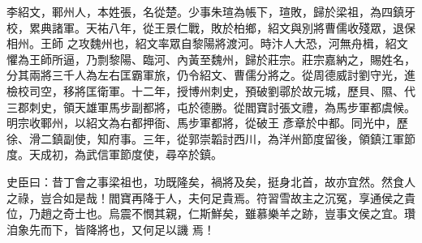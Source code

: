 \begin{pinyinscope}
 李紹文，鄆州人，本姓張，名從楚。少事朱瑄為帳下，瑄敗，歸於梁祖，為四鎮牙校，累典諸軍。天祐八年，從王景仁戰，敗於柏鄉，紹文與別將曹儒收殘眾，退保相州。王師
 之攻魏州也，紹文率眾自黎陽將渡河。時汴人大恐，河無舟楫，紹文懼為王師所逼，乃剽黎陽、臨河、內黃至魏州，歸於莊宗。莊宗嘉納之，賜姓名，分其兩將三千人為左右匡霸軍旅，仍令紹文、曹儒分將之。從周德威討劉守光，進檢校司空，移將匡衛軍。十二年，授博州刺史，預破劉鄩於故元城，歷貝、隰、代三郡刺史，領天雄軍馬步副都將，屯於德勝。從閻寶討張文禮，為馬步軍都虞候。明宗收鄆州，以紹文為右都押衙、馬步軍都將，從破王
 彥章於中都。同光中，歷徐、滑二鎮副使，知府事。三年，從郭崇韜討西川，為洋州節度留後，領鎮江軍節度。天成初，為武信軍節度使，尋卒於鎮。



 史臣曰：昔丁會之事梁祖也，功既隆矣，禍將及矣，挺身北首，故亦宜然。然食人之祿，豈合如是哉！閻寶再降于人，夫何足貴焉。符習雪故主之沉冤，享通侯之貴位，乃趙之奇士也。烏震不憫其親，仁斯鮮矣，雖慕樂羊之跡，豈事文侯之宜。瓚洎象先而下，皆降將也，又何足以譏
 焉！






\end{pinyinscope}